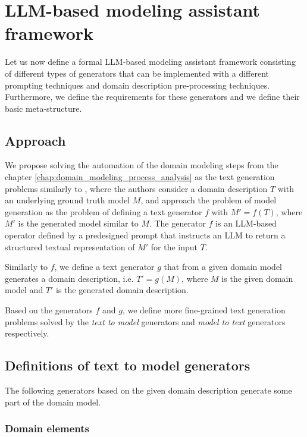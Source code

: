 \chapter{LLM-based modeling assistant framework}
\label{chap:framework}

Let us now define a formal LLM-based modeling assistant framework consisting of different types of generators that can be implemented with a different prompting techniques and domain description pre-processing techniques. Furthermore, we define the requirements for these generators and we define their basic meta-structure.


\section{Approach}

We propose solving the automation of the domain modeling steps from the chapter \ref{chap:domain_modeling_process_analysis} as the text generation problems similarly to \citet{Chen2023}, where the authors consider a domain description $T$ with an underlying ground truth model $M$, and approach the problem of model generation as the problem of defining a text generator $f$ with $M' = f(T)$, where $M'$ is the generated model similar to $M$. The generator $f$ is an LLM-based operator defined by a predesigned prompt that instructs an LLM to return a structured textual representation of $M'$ for the input $T$.

Similarly to $f$, we define a text generator $g$ that from a given domain model generates a domain description, i.e. $T' = g(M)$, where $M$ is the given domain model and $T'$ is the generated domain description.

Based on the generators $f$ and $g$, we define more fine-grained text generation problems solved by the \emph{text to model} generators and \emph{model to text} generators respectively.


\section{Definitions of text to model generators}

The following generators based on the given domain description generate some part of the domain model.


\subsection{Domain elements}

